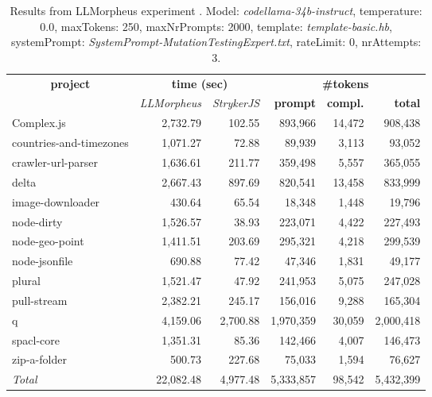 
\begin{table*}[hbt!]
\centering
{\scriptsize
\begin{tabular}{l||r|r|r|r|r}
\multicolumn{1}{c|}{\bf project} & \multicolumn{2}{|c|}{\bf time (sec)} & \multicolumn{3}{|c|}{\bf \#tokens} \\
               & {\it LLMorpheus} & {\it StrykerJS} & {\bf prompt} & {\bf compl.} & {\bf total} \\
\hline
  Complex.js & 2,732.79 & 102.55 & 893,966 & 14,472 & 908,438 \\ 
countries-and-timezones & 1,071.27 & 72.88 & 89,939 & 3,113 & 93,052 \\ 
crawler-url-parser & 1,636.61 & 211.77 & 359,498 & 5,557 & 365,055 \\ 
delta & 2,667.43 & 897.69 & 820,541 & 13,458 & 833,999 \\ 
image-downloader & 430.64 & 65.54 & 18,348 & 1,448 & 19,796 \\ 
node-dirty & 1,526.57 & 38.93 & 223,071 & 4,422 & 227,493 \\ 
node-geo-point & 1,411.51 & 203.69 & 295,321 & 4,218 & 299,539 \\ 
node-jsonfile & 690.88 & 77.42 & 47,346 & 1,831 & 49,177 \\ 
plural & 1,521.47 & 47.92 & 241,953 & 5,075 & 247,028 \\ 
pull-stream & 2,382.21 & 245.17 & 156,016 & 9,288 & 165,304 \\ 
q & 4,159.06 & 2,700.88 & 1,970,359 & 30,059 & 2,000,418 \\ 
spacl-core & 1,351.31 & 85.36 & 142,466 & 4,007 & 146,473 \\ 
zip-a-folder & 500.73 & 227.68 & 75,033 & 1,594 & 76,627 \\ 
\hline
  \textit{Total} & 22,082.48 & 4,977.48 & 5,333,857 & 98,542 & 5,432,399 \\
  \end{tabular}
  }
  \\[2mm]
  \caption{Results from LLMorpheus experiment .
    Model: \textit{codellama-34b-instruct}, 
    temperature: 0.0, 
    maxTokens: 250, 
    maxNrPrompts: 2000, 
    template: \textit{template-basic.hb}, 
    systemPrompt: \textit{SystemPrompt-MutationTestingExpert.txt}, 
    rateLimit: 0, 
    nrAttempts: 3.  
  }
  \label{table:Cost:run391:codellama-34b-instruct:template-basic.hb:0.0}
\end{table*}